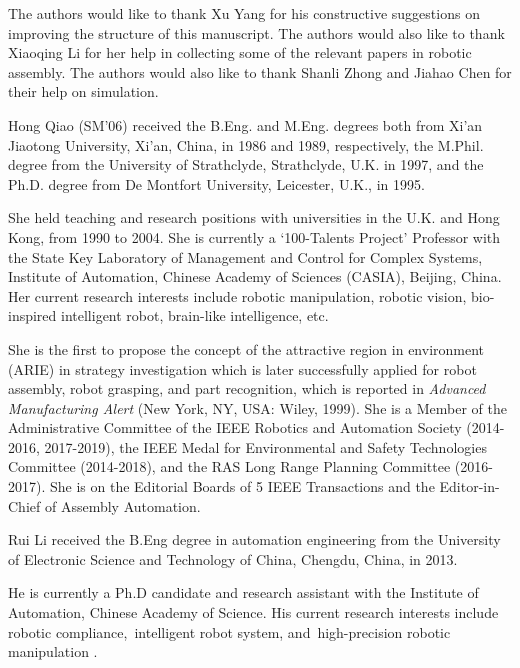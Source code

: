 \documentclass[journal,twoside,web]{ieeecolor}
\begin{document}
The authors would like to thank Xu Yang for his constructive suggestions on improving the structure of this manuscript. The authors would also like to thank Xiaoqing Li for her help in collecting some of the relevant papers in robotic assembly. The authors would also like to thank Shanli Zhong and Jiahao Chen for their help on simulation.





\begin{IEEEbiography}
    {Hong Qiao} (SM'06) received the B.Eng. and M.Eng. degrees both from Xi'an Jiaotong University, Xi’an, China, in 1986 and 1989, respectively, the M.Phil. degree from the University of Strathclyde, Strathclyde, U.K. in 1997, and the Ph.D. degree from De Montfort University, Leicester, U.K., in 1995.
    
    She held teaching and research positions with universities in the U.K. and Hong Kong, from 1990 to 2004. She is currently a `100-Talents Project' Professor with the State Key Laboratory of Management and Control for Complex Systems, Institute of Automation, Chinese Academy of Sciences (CASIA), Beijing, China. Her current research interests include robotic manipulation, robotic vision, bio-inspired intelligent robot, brain-like intelligence, etc.
    
    She is the first to propose the concept of the attractive region in environment (ARIE) in strategy investigation which is later successfully applied for robot assembly, robot grasping, and part recognition, which is reported in \textit{Advanced Manufacturing Alert} (New York, NY, USA: Wiley, 1999). She is a Member of the Administrative Committee of the IEEE Robotics and Automation Society (2014-2016, 2017-2019), the IEEE Medal for Environmental and Safety Technologies Committee (2014-2018), and the RAS Long Range Planning Committee (2016-2017). She is on the Editorial Boards of 5 IEEE Transactions and the Editor-in-Chief of Assembly Automation.
\end{IEEEbiography}
\vfill
\begin{IEEEbiography}{Rui Li}
    received the B.Eng degree in automation engineering from the University of Electronic Science and Technology of China, Chengdu, China, in 2013.
    
    He is currently a Ph.D candidate and research assistant with the Institute of Automation, Chinese Academy of Science. His current research interests include robotic compliance, intelligent robot system, and high-precision robotic manipulation .
\end{IEEEbiography}
\vfill
\end{document}

